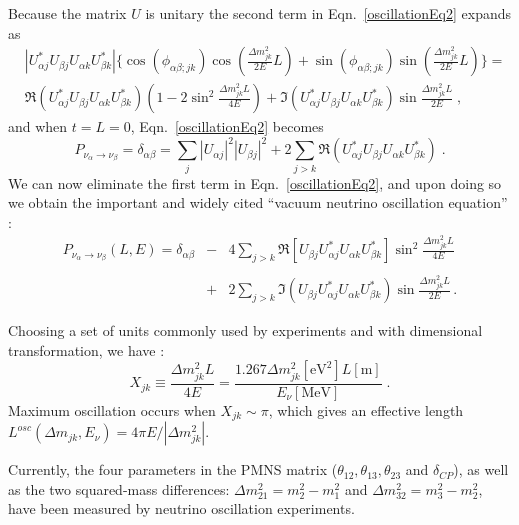 Because the matrix $U$ is unitary the second term in Eqn.~\ref{oscillationEq2} expands as
\begin{equation}
 \begin{split}
&|U^*_{\alpha j}U_{\beta j}U_{\alpha k}U^*_{\beta k}|\{\cos(\phi_{\alpha\beta;jk})\cos(\frac{\Delta m^2_{jk}}{2E}L)+\sin(\phi_{\alpha\beta;jk})\sin(\frac{\Delta m^2_{jk}}{2E}L)\}=\\
&\Re(U^*_{\alpha j}U_{\beta j}U_{\alpha k}U^*_{\beta k})(1-2\sin^2\frac{\Delta m^2_{jk}L}{4E})+\Im(U^*_{\alpha j}U_{\beta j}U_{\alpha k}U^*_{\beta k})\sin\frac{\Delta m^2_{jk}L}{2E} \;,
 \end{split}
\end{equation}
and when $t=L=0$, Eqn.~\ref{oscillationEq2} becomes
\begin{equation}
P_{\nu_\alpha\to\nu_\beta}=\delta_{\alpha\beta}=\sum_j |U_{\alpha j}|^2|U_{\beta j}|^2+2\sum_{j>k}\Re(U^*_{\alpha j}U_{\beta j}U_{\alpha k}U^*_{\beta k}) \; .
\end{equation} 
We can now eliminate the first term in Eqn.~\ref{oscillationEq2}, and upon doing so we obtain the important and widely cited ``vacuum neutrino oscillation equation'' \cite{pdg2020,aitchison2012gauge}:
\begin{eqnarray}\label{common_oscillation}
P_{\nu_\alpha\to\nu_\beta}(L,E) = \delta_{\alpha\beta} &-& 4\sum_{j>k} \Re[U_{\beta j}U^*_{\alpha j}U_{\alpha k}U^*_{\beta k}]\sin^2\frac{\Delta m^2_{jk}L}{4E} \nonumber\\
&\;& \\
&+& 2\sum_{j>k} \Im(U_{\beta j}U^*_{\alpha j}U_{\alpha k}U^*_{\beta k})\sin\frac{\Delta m^2_{jk}L}{2E} \nonumber \, .
\end{eqnarray}

Choosing a set of units commonly used by experiments and with dimensional transformation, we have \cite{pdg2020}:
\begin{equation}\label{oscillationCondition}
X_{jk}\equiv \frac{\Delta m^2_{jk}L}{4E}=\frac{1.267\Delta m_{jk}^2[\mathrm{eV}^2]L[\mathrm{m}]}{E_\nu[\mathrm{MeV}]}\; .
\end{equation}
Maximum oscillation occurs when $X_{jk}\sim \pi$, which gives an effective length $L^{osc}(\Delta m_{jk},E_\nu)=4\pi E/|\Delta m_{jk}^2|$.

Currently, the four parameters in the PMNS matrix ($\theta_{12},\theta_{13},\theta_{23}$ and $\delta_{CP}$), as well as the two squared-mass differences: $\Delta m^2_{21}=m_2^2-m_1^2$ and $\Delta m^2_{32}=m^2_3-m^2_2$, have been measured by neutrino oscillation experiments. 


